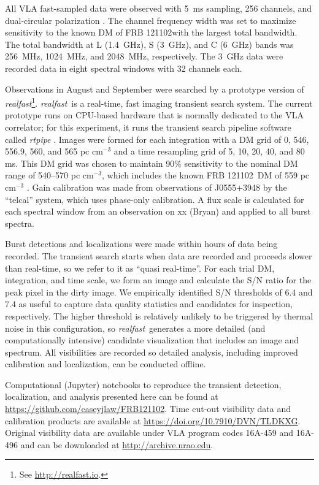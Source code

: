 \documentclass[twocolumn]{aastex61}
\newcommand{\rf}{\emph{realfast}}
\newcommand{\frb}{FRB 121102}
\begin{document}
All VLA fast-sampled data were observed with 5~ms sampling, 256 channels, and dual-circular polarization \citep{2015ApJ...807...16L}. The channel frequency width was set to maximize sensitivity to the known DM of \frb with the largest total bandwidth. The total bandwidth at L (1.4~GHz), S (3~GHz), and C (6~GHz) bands was 256~MHz, 1024~MHz, and 2048~MHz, respectively. The 3~GHz data were recorded data in eight spectral windows with 32 channels each.

Observations in August and September were searched by a prototype version of \rf\footnote{See \url{http://realfast.io}.}. \rf\ is a real-time, fast imaging transient search system. The current prototype runs on CPU-based hardware that is normally dedicated to the VLA correlator; for this experiment, it runs the transient search pipeline software called \emph{rtpipe} \citep[\url{https://github.com/caseyjlaw/rtpipe};][]{2015ApJ...807...16L}. Images were formed for each integration with a DM grid of 0, 546, 556.9, 560, and 565 pc cm$^{-3}$ and a time resampling grid of 5, 10, 20, 40, and 80 ms. This DM grid was chosen to maintain 90\% sensitivity to the nominal DM range of 540--570 pc cm$^{-3}$, which includes the known \frb\ DM of 559 pc cm$^{-3}$ \citep{2016arXiv160308880S}. Gain calibration was made from observations of J0555+3948 by the ``telcal'' system, which uses phase-only calibration. A flux scale is calculated for each spectral window from an observation on {\color{red}xx (Bryan)} and applied to all burst spectra.

Burst detections and localizations were made within hours of data being recorded. The transient search starts when data are recorded and proceeds slower than real-time, so we refer to it as ``quasi real-time''. For each trial DM, integration, and time scale, we form an image and calculate the S/N ratio for the peak pixel in the dirty image. We empirically identified S/N thresholds of 6.4 and 7.4 as useful to capture data quality statistics and candidates for inspection, respectively. The higher threshold is relatively unlikely to be triggered by thermal noise in this configuration, so \rf\ generates a more detailed (and computationally intensive) candidate visualization that includes an image and spectrum. All visibilities are recorded so detailed analysis, including improved calibration and localization, can be conducted offline. 

Computational (Jupyter) notebooks to reproduce the transient detection, localization, and analysis presented here can be found at \url{https://github.com/caseyjlaw/FRB121102}. Time cut-out visibility data and calibration products are available at \url{https://doi.org/10.7910/DVN/TLDKXG}. Original visibility data are available under VLA program codes 16A-459 and 16A-496 and can be downloaded at \url{http://archive.nrao.edu}.
\end{document}
